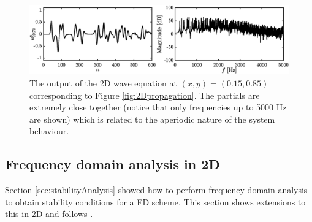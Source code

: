\begin{figure}[h]
    \centering
    \includegraphics[width=\textwidth]{figures/resonators/2d/output2Dwave.eps}
    \caption{The output of the 2D wave equation at $(x,y) = (0.15, 0.85)$ corresponding to Figure \ref{fig:2Dpropagation}. The partials are extremely close together (notice that only frequencies up to 5000 Hz are shown) which is related to the aperiodic nature of the system behaviour. \label{fig:output2DWave}}
\end{figure}

\subsection{Frequency domain analysis in 2D}\label{sec:stability2Dwave}
Section \ref{sec:stabilityAnalysis} showed how to perform frequency domain analysis to obtain stability conditions for a FD scheme. This section shows extensions to this in 2D and follows \cite[Ch. 10]{theBible}.

